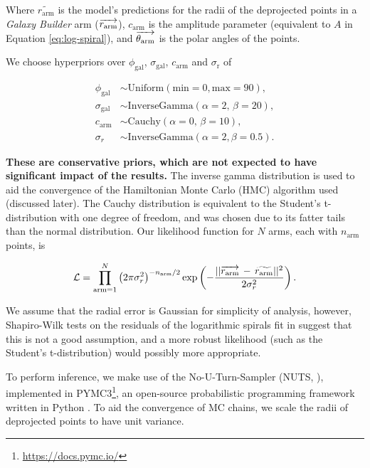 Where $\widetilde{r_\mathrm{arm}}$ is the model's predictions for the radii of the deprojected points in a \textit{Galaxy Builder} arm ($\overrightarrow{r_\mathrm{arm}}$), $c_\mathrm{arm}$ is the amplitude parameter (equivalent to $A$ in Equation \ref{eq:log-spiral}), and $\overrightarrow{\theta_\mathrm{arm}}$ is the polar angles of the points.

We choose hyperpriors over $\phi_\mathrm{gal}$, $\sigma_\mathrm{gal}$, $c_\mathrm{arm}$ and $\sigma_\mathrm{r}$ of

\begin{align}
  \phi_\mathrm{gal} &\sim \mathrm{Uniform}(\mathrm{min}=0, \mathrm{max}=90),\\
  \sigma_\mathrm{gal} &\sim \mathrm{InverseGamma}(\alpha=2,\,\beta=20),\\
  c_\mathrm{arm} &\sim \mathrm{Cauchy}(\alpha=0,\,\beta=10),\\
  \sigma_r &\sim \mathrm{InverseGamma}(\alpha=2, \beta=0.5).
\end{align}

\textbf{These are conservative priors, which are not expected to have significant impact of the results.} The inverse gamma distribution is used to aid the convergence of the Hamiltonian Monte Carlo (HMC) algorithm used (discussed later). The Cauchy distribution is equivalent to the Student's t-distribution with one degree of freedom, and was chosen due to its fatter tails than the normal distribution. Our likelihood function for $N$ arms, each with $n_\mathrm{arm}$ points, is

\begin{equation}
  \mathcal{L} = \prod_{\mathrm{arm}=1}^{N}\left(2\pi\sigma_r^2\right)^{-n_\mathrm{arm}/2}
  \exp\left(-\frac{||\overrightarrow{r_\mathrm{arm}}\,-\,\widetilde{r_\mathrm{arm}}||^2}{2\sigma_r^2}\right).
\end{equation}

We assume that the radial error is Gaussian for simplicity of analysis, however, Shapiro-Wilk tests on the residuals of the logarithmic spirals fit in \citet{2020arXiv200610450L} suggest that this is not a good assumption, and a more robust likelihood (such as the Student's t-distribution) would possibly more appropriate.

To perform inference, we make use of the No-U-Turn-Sampler (NUTS, \citealt{2011arXiv1111.4246H}), implemented in PYMC3\footnote{\url{https://docs.pymc.io/}}, an open-source probabilistic programming framework written in Python \citep{pymc3_paper}. To aid the convergence of MC chains, we scale the radii of deprojected points to have unit variance.
